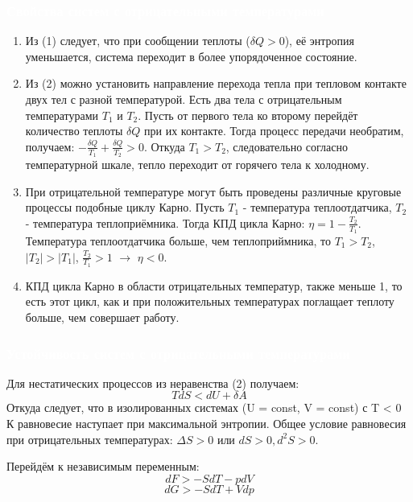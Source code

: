 \documentclass[aspectratio=169]{beamer}
\begin{document}
\begin{frame}
\frametitle{\textcolor{white}{Свойства систем с отрицательными температурами}}
\vspace{0.05cm}
\begin{enumerate}
\item Из (1) следует, что при сообщении теплоты ($\delta Q > 0$), её энтропия уменьшается, система переходит в более упорядоченное состояние.

\item Из (2) можно установить направление перехода тепла при тепловом контакте двух тел с разной температурой. Есть два тела с отрицательным температурами $T_1$ и $T_2$. Пусть от первого тела ко второму перейдёт количество теплоты $\delta Q$ при их контакте. Тогда процесс передачи необратим, получаем: $-\frac{\delta Q}{T_1} + \frac{\delta Q}{T_2} > 0$.
Откуда $T_1 > T_2$, следовательно согласно температурной шкале, тепло переходит от горячего тела к холодному.

\item При отрицательной температуре могут быть проведены различные круговые процессы подобные циклу Карно. Пусть $T_1$ - температура теплоотдатчика, $T_2$ - температура теплоприёмника. Тогда КПД цикла Карно: $\eta = 1 - \frac{T_2}{T_1}$. Температура теплоотдатчика больше, чем теплоприймника, то $T_1 > T_2$, $|T_2| > |T_1|$, $\frac{T_2}{T_1} > 1$ $\rightarrow$ $\eta < 0$.
\item КПД цикла Карно в области отрицательных температур, также меньше 1, то есть этот цикл, как и при положительных температурах поглащает теплоту больше, чем совершает работу.
\end{enumerate}
\end{frame}

\begin{frame}
\frametitle{\textcolor{white}{Устойчивость систем с отрицательными температурами}}
Для нестатических процессов из неравенства (2) получаем:
\begin{equation}
TdS < dU + \delta A
\end{equation}
Откуда следует, что в изолированных системах (U = const, V = const) с T < 0 К равновесие наступает при максимальной энтропии.
Общее условие равновесия при отрицательных температурах: $\Delta S > 0$ или $dS > 0, d^2S > 0$.

Перейдём к независимым переменным:
\begin{equation}
dF > -SdT - pdV
\end{equation}
\begin{equation}
dG > -SdT + Vdp
\end{equation}

\end{frame}
\end{document}
